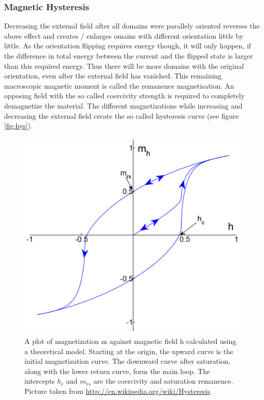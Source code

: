 \documentclass[a4paper]{scrartcl}
\numberwithin{equation}{section}
\numberwithin{figure}{section}
\numberwithin{table}{section}
\begin{document}
\subsubsection*{Magnetic Hysteresis}
Decreasing the external field after all domains were parallely oriented reverses the above effect and creates / enlarges omains with different orientation little by little. As the orientation flipping requires energy though, it will only happen, if the difference in total energy between the current and the flipped state is larger than this required energy. Thus there will be more domains with the original orientation, even after the external field has vanished. This remaining macroscopic magnetic moment is called the remanence magnetisation. An opposing field with the so called coercivity strength is required to completely demagnetize the material. The different magnetizations while increasing and decreasing the external field create the so called hysteresis curve (see figure \ref{fig:hys}).
\begin{figure}
        \begin{center}
        		\includegraphics[width=0.31\linewidth]{img/hys.pdf}
        \end{center}
        \caption{
			\small A plot of magnetization m against magnetic field h calculated using a theoretical model. Starting at the origin, the upward curve is the initial magnetization curve. The downward curve after saturation, along with the lower return curve, form the main loop. The intercepts $h_c$ and $m_{rs}$ are the coercivity and saturation remanence. Picture taken from \url{http://en.wikipedia.org/wiki/Hysteresis}.
        }
        \label{fig:doms}
\end{figure}

 

\end{document}
